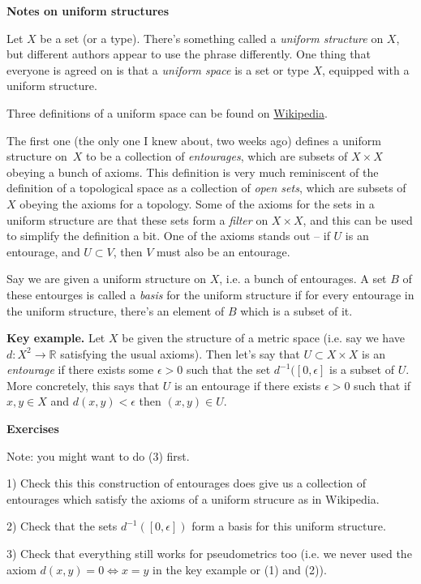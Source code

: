 \documentclass[12pt,a4paper]{article}
\newcommand{\R}{\mathbb{R}}
\begin{document}
\begin{center}{\Large\bf{Notes on uniform structures}}\end{center}

Let $X$ be a set (or a type). There's something called a \emph{uniform structure} on $X$, but different authors appear to use the phrase differently. One thing that everyone is agreed on is that a \emph{uniform space} is a set or type $X$, equipped with a uniform structure.

Three definitions of a uniform space can be found on \href{https://en.wikipedia.org/wiki/Uniform_space}{Wikipedia}. 

The first one (the only one I knew about, two weeks ago) defines a uniform structure on~$X$ to be a collection of \emph{entourages}, which are subsets of $X\times X$ obeying a bunch of axioms. This definition is very much reminiscent of the definition of a topological space as a collection of \emph{open sets}, which are subsets of $X$ obeying the axioms for a topology. Some of the axioms for the sets in a uniform structure are that these sets form a \emph{filter} on $X\times X$, and this can be used to simplify the definition a bit. One of the axioms stands out -- if $U$ is an entourage, and $U\subset V$, then $V$ must also be an entourage.

Say we are given a uniform structure on $X$, i.e. a bunch of entourages. A set $B$ of these entourges is called a \emph{basis} for the uniform structure if for every entourage in the uniform structure, there's an element of $B$ which is a subset of it.

{\bf Key example.} Let $X$ be given the structure of a metric space (i.e. say we have $d:X^2\to\R$ satisfying the usual axioms). Then let's say that $U\subset X\times X$ is an \emph{entourage} if there exists some $\epsilon>0$ such that the set $d^{-1}([0,\epsilon]$ is a subset of $U$. More concretely, this says that $U$ is an entourage if there exists $\epsilon>0$ such that if $x,y\in X$ and $d(x,y)<\epsilon$ then $(x,y)\in U$.

{\bf Exercises}

Note: you might want to do (3) first.

1) Check this this construction of entourages does give us a collection of entourages which satisfy the axioms of a uniform strucure as in Wikipedia.

2) Check that the sets $d^{-1}([0,\epsilon])$ form a basis for this uniform structure.

3) Check that everything still works for pseudometrics too (i.e. we never used the axiom $d(x,y)=0\iff x=y$ in the key example or (1) and (2)). 
\end{document}
